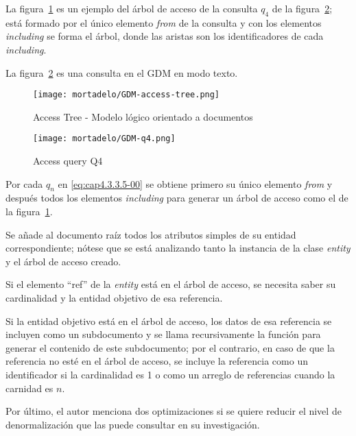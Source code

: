 La figura~\ref{img:mortadelo-gdm-logical-model-access-tree} es un ejemplo del árbol de acceso de la consulta $q_{4}$ de la figura~\ref{img:mortadelo-gdm-logical-model-q4}; está formado por el único elemento \textit{from} de la consulta y con los elementos \textit{including} se forma el árbol, donde las aristas son los identificadores de cada \textit{including}.


La figura~\ref{img:mortadelo-gdm-logical-model-q4} es una consulta en el GDM en modo texto.


\begin{figure}[H] 
    \centering
    \texttt{[image: mortadelo/GDM-access-tree.png]}
    \caption{Access Tree - Modelo lógico orientado a documentos}
    \label{img:mortadelo-gdm-logical-model-access-tree}
\end{figure}


\begin{figure}[H] 
    \centering
    \texttt{[image: mortadelo/GDM-q4.png]}
    \caption{Access query Q4}
    \label{img:mortadelo-gdm-logical-model-q4}
\end{figure}


Por cada $q_{n}$ en \eqref{eq:cap4.3.3.5-00} se obtiene primero su único elemento \textit{from} y después todos los elementos \textit{including} para generar un árbol de acceso como el de la figura~\ref{img:mortadelo-gdm-logical-model-access-tree}.


Se añade al documento raíz todos los atributos simples de su entidad correspondiente; nótese que se está analizando tanto la instancia de la clase \textit{entity} y el árbol de acceso creado.


Si el elemento ``ref'' de la \textit{entity} está en el árbol de acceso, se necesita saber su cardinalidad y la entidad objetivo de esa referencia.


Si la entidad objetivo está en el árbol de acceso, los datos de esa referencia se incluyen como un subdocumento y se llama recursivamente la función para generar el contenido de este subdocumento; por el contrario, en caso de que la referencia no esté en el árbol de acceso, se incluye la referencia como un identificador si la cardinalidad es 1 o como un arreglo de referencias cuando la carnidad es $n$.


Por último, el autor menciona dos optimizaciones si se quiere reducir el nivel de denormalización que las puede consultar en su investigación\cite{de_la_vega_mortadelo_2020}.

